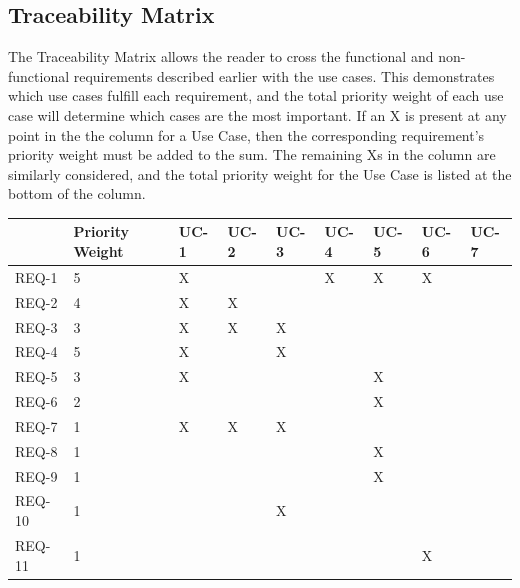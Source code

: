 \documentclass[letterpaper,english, 12pt]{scrreprt}
\begin{document}
\subsection{Traceability Matrix}
The Traceability Matrix allows the reader to cross the functional and non-functional requirements described earlier with the use cases. This demonstrates which use cases fulfill each requirement, and the total priority weight of each use case will determine which cases are the most important. If an X is present at any point in the the column for a Use Case, then the corresponding requirement's priority weight must be added to the sum. The remaining Xs in the column are similarly considered, and the total priority weight for the Use Case is listed at the bottom of the column. 

\renewcommand{\arraystretch}{0.4}
\begin{center}
        \begin{tabular}{|C{1cm}|C{1cm}|C{1cm}|C{1cm}|C{1cm}|C{1cm}|C{1cm}|C{1cm}|C{1cm}|}
                \hline
                         & Priority Weight & UC-1 & UC-2 & UC-3 & UC-4 & UC-5 & UC-6 & UC-7\\
                \hline
                        REQ-1  & 5 & X &   &   & X & X & X & \\
                \hline
                        REQ-2  & 4 & X & X &   &   &   &   & \\
                \hline
                        REQ-3  & 3 & X & X & X &   &   &   & \\
                \hline
                        REQ-4  & 5 & X &   & X &   &   &   & \\
                \hline
                        REQ-5  & 3 & X &   &   &   & X &   & \\
                \hline
                        REQ-6  & 2 &   &   &   &   & X &   & \\
                \hline
                        REQ-7  & 1 & X & X & X &   &   &   & \\
                \hline
                        REQ-8  & 1 &   &   &   &   & X &   & \\
                \hline
                        REQ-9  & 1 &   &   &   &   & X &   & \\
                \hline
                        REQ-10 & 1 &   &   & X &   &   &   & \\
                \hline
                        REQ-11 & 1 &   &   &   &   &   & X & \\
		        \hline

\end{tabular}
\end{center}
\end{document}
